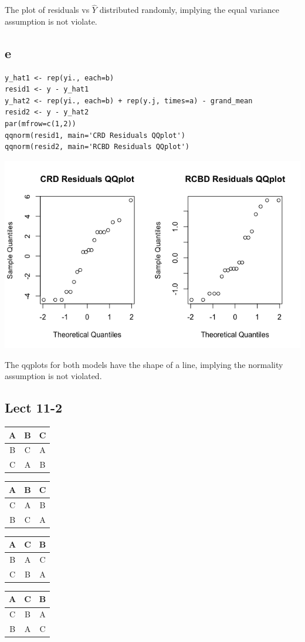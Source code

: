 \documentclass[11pt,letterpaper]{article}
\begin{document}
\noindent The plot of residuals vs $\hat{Y}$ distributed randomly, implying the equal variance assumption is not violate. 


\subsection*{e}
\begin{verbatim}
y_hat1 <- rep(yi., each=b)
resid1 <- y - y_hat1
y_hat2 <- rep(yi., each=b) + rep(y.j, times=a) - grand_mean
resid2 <- y - y_hat2
par(mfrow=c(1,2))
qqnorm(resid1, main='CRD Residuals QQplot')
qqnorm(resid2, main='RCBD Residuals QQplot')
\end{verbatim}
\includegraphics[scale=0.7]{lect-11-1-e.png}

\noindent The qqplots for both models have the shape of a line, implying the normality assumption is not violated. 

\subsection*{Lect 11-2}
\begin{tabular}{|ccc|}
\hline
A&B&C\\
\hline
B&C&A\\
\hline
C&A&B\\
\hline
\end{tabular}
\quad
\begin{tabular}{|ccc|}
\hline
A&B&C\\
\hline
C&A&B\\
\hline
B&C&A\\
\hline
\end{tabular}
\quad
\begin{tabular}{|ccc|}
\hline
A&C&B\\
\hline
B&A&C\\
\hline
C&B&A\\
\hline
\end{tabular}
\quad
\begin{tabular}{|ccc|}
\hline
A&C&B\\
\hline
C&B&A\\
\hline
B&A&C\\
\hline
\end{tabular}
\newline
\newline
\end{document}
